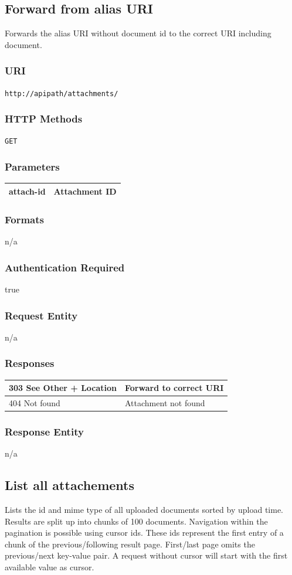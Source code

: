 \documentclass[10pt]{article}
\begin{document}
\subsection{Forward from alias URI}
Forwards the alias URI without document id to the correct URI including document.
\subsubsection{URI}
\texttt{http://apipath/attachments/
}
\subsubsection{HTTP Methods}
\texttt{GET}
\subsubsection{Parameters}
\begin{tabular}{|l|l|}\hline
attach-id & Attachment ID \\
\hline
\end{tabular}
\subsubsection{Formats}
n/a
\subsubsection{Authentication Required}
true
\subsubsection{Request Entity}
n/a
\subsubsection{Responses}
\begin{tabular}{|l|l|}\hline
303 See Other + Location  & Forward to correct URI \\
\hline
404 Not found & Attachment not found \\
\hline
\end{tabular}
\subsubsection{Response Entity}
n/a


\subsection{List all attachements}
Lists the id and mime type of all uploaded documents sorted by upload time. Results are split up into chunks of 100 documents. Navigation within the pagination is possible using cursor ids. These ids represent the first entry of a chunk of the previous/following result page. First/last page omits the previous/next key-value pair. A request without cursor will start with the first available value as cursor.
\end{document}

